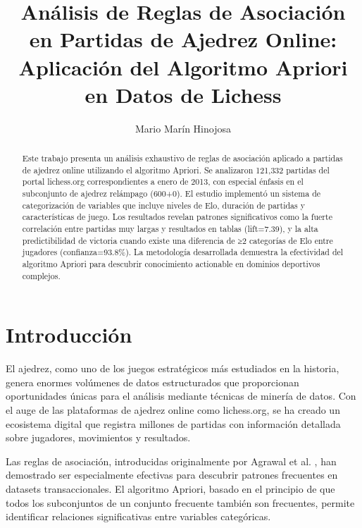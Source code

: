 \documentclass[runningheads]{llncs}
\begin{document}
\title{Análisis de Reglas de Asociación en Partidas de Ajedrez Online: Aplicación del Algoritmo Apriori en Datos de Lichess}

\author{Mario Marín Hinojosa}



\maketitle

\begin{abstract}
Este trabajo presenta un análisis exhaustivo de reglas de asociación aplicado a partidas de ajedrez online utilizando el algoritmo Apriori. Se analizaron 121,332 partidas del portal lichess.org correspondientes a enero de 2013, con especial énfasis en el subconjunto de ajedrez relámpago (600+0). El estudio implementó un sistema de categorización de variables que incluye niveles de Elo, duración de partidas y características de juego. Los resultados revelan patrones significativos como la fuerte correlación entre partidas muy largas y resultados en tablas (lift=7.39), y la alta predictibilidad de victoria cuando existe una diferencia de ≥2 categorías de Elo entre jugadores (confianza=93.8\%). La metodología desarrollada demuestra la efectividad del algoritmo Apriori para descubrir conocimiento actionable en dominios deportivos complejos.

\end{abstract}

\section{Introducción}

El ajedrez, como uno de los juegos estratégicos más estudiados en la historia, genera enormes volúmenes de datos estructurados que proporcionan oportunidades únicas para el análisis mediante técnicas de minería de datos. Con el auge de las plataformas de ajedrez online como lichess.org, se ha creado un ecosistema digital que registra millones de partidas con información detallada sobre jugadores, movimientos y resultados.

Las reglas de asociación, introducidas originalmente por Agrawal et al. \cite{agrawal1993mining}, han demostrado ser especialmente efectivas para descubrir patrones frecuentes en datasets transaccionales. El algoritmo Apriori, basado en el principio de que todos los subconjuntos de un conjunto frecuente también son frecuentes, permite identificar relaciones significativas entre variables categóricas.
\end{document}
